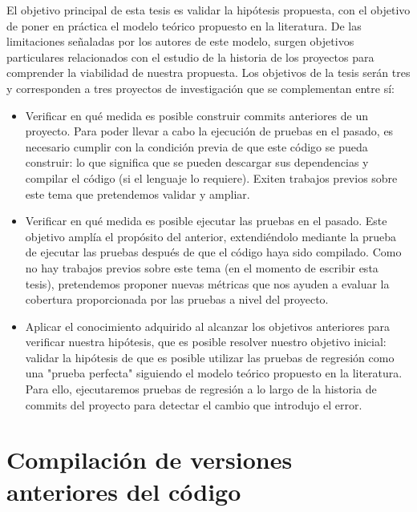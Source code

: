 El objetivo principal de esta tesis es validar la hipótesis propuesta, con el objetivo de poner en práctica el modelo teórico propuesto en la literatura. 
De las limitaciones señaladas por los autores de este modelo, surgen objetivos particulares relacionados con el estudio de la historia de los proyectos para comprender la viabilidad de nuestra propuesta. 
Los objetivos de la tesis serán tres y corresponden a tres proyectos de investigación que se complementan entre sí:
\begin{itemize}
    \item Verificar en qué medida es posible construir commits anteriores de un proyecto. Para poder llevar a cabo la ejecución de pruebas en el pasado, es necesario cumplir con la condición previa de que este código se pueda construir: lo que significa que se pueden descargar sus dependencias y compilar el código (si el lenguaje lo requiere). Exiten trabajos previos sobre este tema que pretendemos validar y ampliar.
    \item Verificar en qué medida es posible ejecutar las pruebas en el pasado. Este objetivo amplía el propósito del anterior, extendiéndolo mediante la prueba de ejecutar las pruebas después de que el código haya sido compilado. Como no hay trabajos previos sobre este tema (en el momento de escribir esta tesis), pretendemos proponer nuevas métricas que nos ayuden a evaluar la cobertura proporcionada por las pruebas a nivel del proyecto.
    \item Aplicar el conocimiento adquirido al alcanzar los objetivos anteriores para verificar nuestra hipótesis, que es posible resolver nuestro objetivo inicial: validar la hipótesis de que es posible utilizar las pruebas de regresión como una "prueba perfecta" siguiendo el modelo teórico propuesto en la literatura. Para ello, ejecutaremos pruebas de regresión a lo largo de la historia de commits del proyecto para detectar el cambio que introdujo el error.
\end{itemize}

\section{Compilación de versiones anteriores del código}
\label{sec:resumen:buildability}

